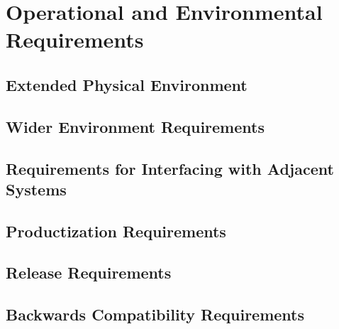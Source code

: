 \section{Operational and Environmental Requirements}
\subsection{Extended Physical Environment}
\subsection{Wider Environment Requirements}
\subsection{Requirements for Interfacing with Adjacent Systems}
\subsection{Productization Requirements}
\subsection{Release Requirements}
\subsection{Backwards Compatibility Requirements}
